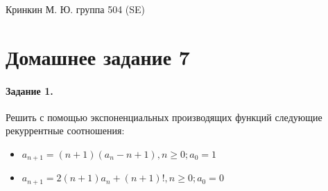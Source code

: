 \documentclass[a4paper,12pt]{article}
\begin{document}
\sloppy

\lstset{
	basicstyle=\small,
	stringstyle=\ttfamily,
	showstringspaces=false,
	columns=fixed,
	breaklines=true,
	numbers=right,
	numberstyle=\tiny
}

\newtheorem{Def}{Определение}[section]
\newtheorem{Th}{Теорема}
\newtheorem{Lem}[Th]{Лемма}
\newenvironment{Proof}
	{\par\noindent{\bf Доказательство.}}
	{\hfill$\scriptstyle\blacksquare$}
\newenvironment{Solution}
	{\par\noindent{\bf Решение.}}
	{\hfill$\scriptstyle\blacksquare$}


\begin{flushright}
	Кринкин М. Ю. группа 504 (SE)
\end{flushright}

\section{Домашнее задание 7}

\paragraph{Задание 1.} Решить с помощью экспоненциальных производящих функций следующие рекуррентные соотношения:

\begin{itemize}
\item $a_{n+1} = \left(n+1\right) \left(a_n - n + 1\right), n \ge 0; a_0 = 1$

\item $a_{n+1} = 2 \left(n+1\right)a_n + \left(n+1\right)!, n \ge 0; a_0 = 0$
\end{itemize}
\end{document}
